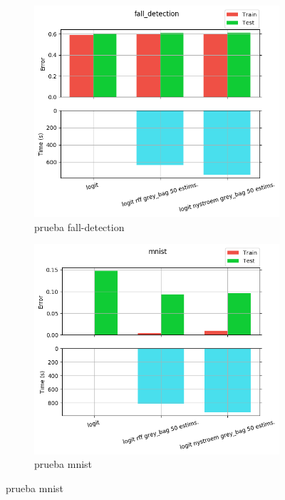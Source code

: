 \begin{figure}[ht]
  \centering
  \begin{subfigure}[b]{0.5\linewidth}
    \centering\includegraphics[width=\imgscale\linewidth]{Figures/2_3/fall_detection}
    \caption{prueba fall-detection}
    \label{fig:2_3_fall_detection}
  \end{subfigure}%
  \begin{subfigure}[b]{0.5\linewidth}
    \centering\includegraphics[width=\imgscale\linewidth]{Figures/2_3/mnist}
    \caption{prueba mnist}
    \label{fig:2_3_mnist}
  \end{subfigure}
\end{figure}



